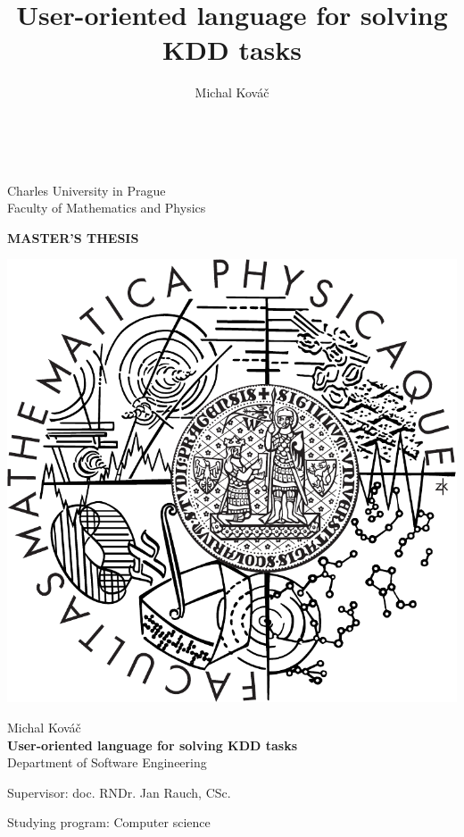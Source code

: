 \documentclass[a4paper,12pt]{book}
\author{Michal Kováč}
\title{User-oriented language for solving KDD tasks}
\begin{document}
\begin{titlepage}
\begin{center}
\ \\

\vspace{15mm}

\large
Charles University in Prague\\
Faculty of Mathematics and Physics\\

\vspace{5mm}

{\Large\bf MASTER'S THESIS}

\vspace{10mm}

\includegraphics[scale=0.5]{logo}

\vspace{15mm}

{\Large Michal Kováč}\\
\vspace{5mm}
{\Large\bf User-oriented language for solving KDD tasks}\\
\vspace{5mm}
Department of Software Engineering
\vspace{15mm}

\large
\noindent Supervisor: doc. RNDr. Jan Rauch, CSc.
\vspace{1mm}

\noindent Studying program: Computer science
\end{center}
\end{titlepage} %
\end{document}
